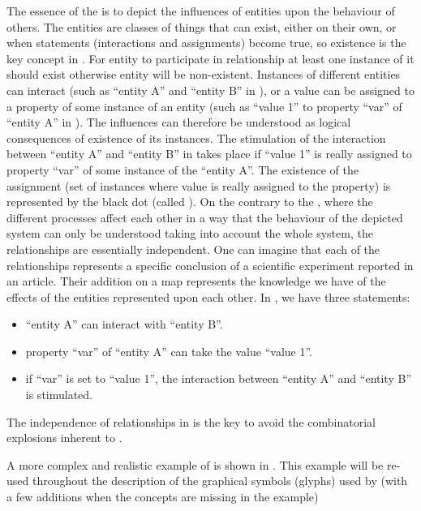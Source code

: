 The essence of the \ERs is to depict the influences of entities upon the behaviour of others. The entities are classes of things that can exist, either on their own, or when statements (interactions and assignments) become true, so existence is the key concept in \ERs. For entity to participate in relationship at least one instance of it should exist otherwise entity will be non-existent. Instances of different entities can interact (such as ``entity A'' and ``entity B'' in ), or a value can be assigned to a property of some instance of an entity (such as ``value 1'' to property ``var'' of ``entity A'' in ). The influences can therefore be understood as logical consequences of existence of its instances. The stimulation of the interaction between ``entity A'' and ``entity B'' in  takes place if ``value 1'' is really assigned to property ``var'' of some instance of the ``entity A''. The existence of the assignment (set of instances where value is really assigned to the property) is represented by the black dot (called ). On the contrary to the \PDl, where the different processes affect each other in a way that the behaviour of the depicted system can only be understood taking into account the whole system, the relationships are essentially independent. One can imagine that each of the relationships represents a specific conclusion of a scientific experiment reported in an article. Their addition on a map represents the knowledge we have of the effects of the entities represented upon each other. In  , we have three statements: 

\begin{itemize}
 \item ``entity A'' can interact with ``entity B''.
 \item property ``var'' of ``entity A'' can take the value ``value 1''.
 \item if ``var'' is set to ``value 1'', the interaction between ``entity A'' and ``entity B'' is stimulated.
\end{itemize}


The independence of relationships in \ERs is the key to avoid the combinatorial explosions inherent to \PDs.

A more complex and realistic example of \ERm is shown in . This example will be re-used throughout the description of the graphical symbols (glyphs) used by \SBGNERLone (with a few additions when the concepts are missing in the example) 

